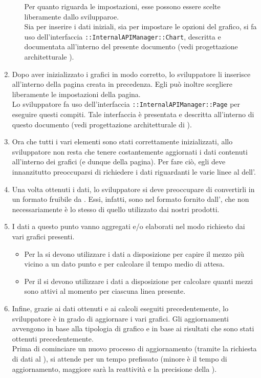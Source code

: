 \begin{enumerate}
\begin{itemize}
                Per quanto riguarda le impostazioni, esse possono essere scelte liberamente dallo svilupparoe.\\
                Sia per inserire i dati iniziali, sia per impostare le opzioni del grafico, si fa uso dell'interfaccia \texttt{::InternalAPIManager::Chart}, descritta e documentata all'interno del presente documento (vedi progettazione architetturale ).
            \end{itemize}
            \item Dopo aver inizializzato i grafici in modo corretto, lo sviluppatore li inserisce all'interno della pagina creata in precedenza. Egli può inoltre scegliere liberamente le impostazioni della pagina.\\
            Lo sviluppatore fa uso dell'interfaccia \texttt{::InternalAPIManager::Page} per eseguire questi compiti. Tale interfaccia è presentata e descritta all'interno di questo documento (vedi progettazione architetturale di ).
            \item Ora che tutti i vari elementi sono stati correttamente inizializzati, allo sviluppatore non resta che tenere costantemente aggiornati i dati contenuti all'interno dei grafici (e dunque della pagina). Per fare ciò, egli deve innanzitutto preoccuparsi di richiedere i dati riguardanti le varie linee al  dell'.
            \item Una volta ottenuti i dati, lo sviluppatore si deve preoccupare di convertirli in un formato fruibile da . Essi, infatti, sono nel formato fornito dall', che non necessariamente è lo stesso di quello utilizzato dai nostri prodotti.
            \item I dati a questo punto vanno aggregati e/o elaborati nel modo richiesto dai vari grafici presenti.
            \begin{itemize}
                \item Per la  si devono utilizzare i dati a disposizione per capire il mezzo più vicino a un dato punto e per calcolare il tempo medio di attesa.
                \item Per il  si devono utilizzare i dati a disposizione per calcolare quanti mezzi sono attivi al momento per ciascuna linea presente.
            \end{itemize}
            \item Infine, grazie ai dati ottenuti e ai calcoli eseguiti precedentemente, lo sviluppatore è in grado di aggiornare i vari grafici. Gli aggiornamenti avvengono in base alla tipologia di grafico e in base ai risultati che sono stati ottenuti precedentemente.\\
            Prima di cominciare un nuovo processo di aggiornamento (tramite la richiesta di dati al  ), si attende per un tempo prefissato (minore è il tempo di aggiornamento, maggiore sarà la reattività e la precisione della ).
        \end{enumerate}